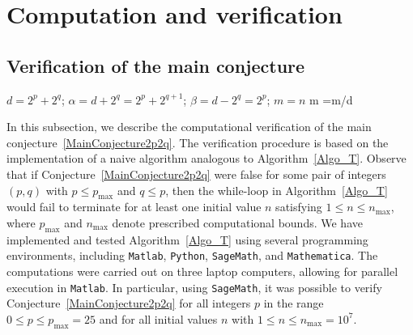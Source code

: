 \documentclass[11pt,a4paper]{article}
\newcommand*\modd[3]{#1\equiv#2\;( {\rm mod}\;  #3)}
\begin{document}
\section{Computation and verification }\label{sec:Verification}

\subsection{Verification of the main conjecture}

%	
\begin{algorithm}[thbp!]
	\caption{Algorithm for testing conjecture~\ref{MainConjecture2p2q}.}
	\label{Algo_T}
	\begin{algorithmic}[1]
		\State $d = 2^p+2^q$; $\alpha = d+2^q=2^p+2^{q+1}$; $\beta =d-2^q=2^p$;
		\EndIf
		\EndIf
		\EndIf
		\EndIf
		\EndIf
		\EndIf
		\EndIf
		\EndIf
		\State $m=n$
		\If{$\modd{m}{0}{d}$}
		\State m =m/d
		\Else 
		\EndIf
		\EndWhile
		\EndFor
		\EndFor
		\EndFor
	\end{algorithmic}
\end{algorithm} 
%

In this subsection, we describe the computational verification of the main conjecture~\ref{MainConjecture2p2q}.
The verification procedure is based on the implementation of a naive algorithm analogous to Algorithm~\ref{Algo_T}.
Observe that if Conjecture~\ref{MainConjecture2p2q} were false for some pair of integers $(p,q)$ with
$p \leq p_{\max}$ and $q \leq p$, then the while-loop in Algorithm~\ref{Algo_T} would fail to terminate
for at least one initial value $n$ satisfying
$1 \leq n \leq n_{\max}$, where $p_{\max}$ and $n_{\max}$ denote prescribed computational bounds.  We have implemented and tested Algorithm~\ref{Algo_T} using several programming environments, including
\texttt{Matlab}, \texttt{Python}, \texttt{SageMath}, and \texttt{Mathematica}.
The computations were carried out on three laptop computers, allowing for parallel execution in \texttt{Matlab}.
In particular, using \texttt{SageMath}, it was possible to verify Conjecture~\ref{MainConjecture2p2q}
for all integers $p$ in the range
$0 \leq p \leq p_{\max} = 25$ and for all initial values $n$ with
$1 \leq n \leq n_{\max} = 10^7$.  
\end{document}
